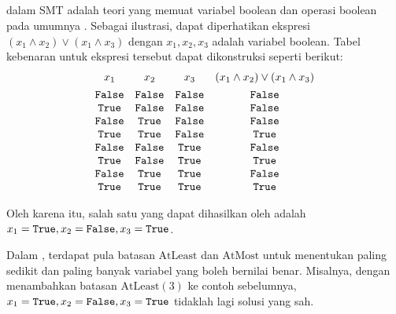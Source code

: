 \subsection{}

 dalam SMT adalah teori yang memuat variabel boolean dan operasi boolean pada umumnya \citep{yurichev}. Sebagai ilustrasi, dapat diperhatikan ekspresi \((x_1 \land x_2) \lor (x_1 \land x_3)\) dengan \(x_1, x_2, x_3\) adalah variabel boolean. Tabel kebenaran untuk ekspresi tersebut dapat dikonstruksi seperti berikut:
\vspace{-0.5em}
\[
\begin{array}{cccc}
	x_1 & x_2 & x_3 & (x_1 \land x_2) \lor (x_1 \land x_3) \\ [4pt]
	\mathtt{False} & \mathtt{False} & \mathtt{False} & \mathtt{False} \\
	 \mathtt{True} & \mathtt{False} & \mathtt{False} & \mathtt{False} \\
	\mathtt{False} &  \mathtt{True} & \mathtt{False} & \mathtt{False} \\
	 \mathtt{True} &  \mathtt{True} & \mathtt{False} &  \mathtt{True} \\
	\mathtt{False} & \mathtt{False} &  \mathtt{True} & \mathtt{False} \\
	 \mathtt{True} & \mathtt{False} &  \mathtt{True} &  \mathtt{True} \\
	\mathtt{False} &  \mathtt{True} &  \mathtt{True} & \mathtt{False} \\
	 \mathtt{True} &  \mathtt{True} &  \mathtt{True} &  \mathtt{True}
\end{array}
\]

\noindent Oleh karena itu, salah satu  yang dapat dihasilkan oleh  adalah \(x_1 = \mathtt{True}, x_2 = \mathtt{False}, x_3 = \mathtt{True}\).

Dalam , terdapat pula batasan \(\mathrm{AtLeast}\) dan \(\mathrm{AtMost}\) untuk menentukan paling sedikit dan paling banyak variabel yang boleh bernilai benar. Misalnya, dengan menambahkan batasan \(\mathrm{AtLeast}(3)\) ke contoh sebelumnya, \(x_1 = \mathtt{True}, x_2 = \mathtt{False}, x_3 = \mathtt{True}\) tidaklah lagi solusi yang sah.

\subsection{}

